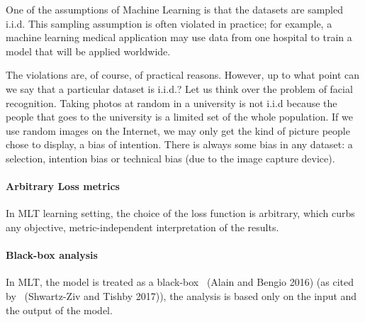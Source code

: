 \documentclass[
  letterpaper,
  12pt,
  british]{tufte-book}
\let\oldparagraph\paragraph
\renewcommand{\paragraph}[1]{\oldparagraph{#1}\mbox{}}
\theoremstyle{plain}
\theoremstyle{definition}
\theoremstyle{plain}
\theoremstyle{remark}
\begin{document}
One of the assumptions of Machine Learning is that the datasets are
sampled i.i.d. This sampling assumption is often violated in practice;
for example, a machine learning medical application may use data from
one hospital to train a model that will be applied worldwide.

The violations are, of course, of practical reasons. However, up to what
point can we say that a particular dataset is i.i.d.? Let us think over
the problem of facial recognition. Taking photos at random in a
university is not i.i.d because the people that goes to the university
is a limited set of the whole population. If we use random images on the
Internet, we may only get the kind of picture people chose to display, a
bias of intention. There is always some bias in any dataset: a
selection, intention bias or technical bias (due to the image capture
device).

\hypertarget{arbitrary-loss-metrics}{%
\paragraph{Arbitrary Loss metrics}\label{arbitrary-loss-metrics}}

In {MLT} learning setting, the choice of the loss function is arbitrary,
which curbs any objective, metric-independent interpretation of the
results.

\hypertarget{blackbox}{%
\paragraph{Black-box analysis}\label{blackbox}}

In {MLT}, the model is treated as a black-box ~(Alain and Bengio
2016)
(as cited by ~(Shwartz-Ziv and Tishby
2017)),
the analysis is based only on the input and the output of the model.
\end{document}
